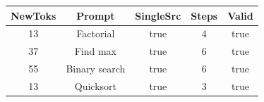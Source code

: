 \begin{table}[h]
\centering
\begin{tabular}{ |c|c|c|c|c| }
\hline
NewToks & Prompt & SingleSrc & Steps & Valid \\
\hline
13 & Factorial & true & 4 & true \\
\hline
37 & Find max & true & 6 & true \\
\hline
55 & Binary search & true & 6 & true \\
\hline
13 & Quicksort & true & 3 & true \\
\hline
\end{tabular}
\end{table}
